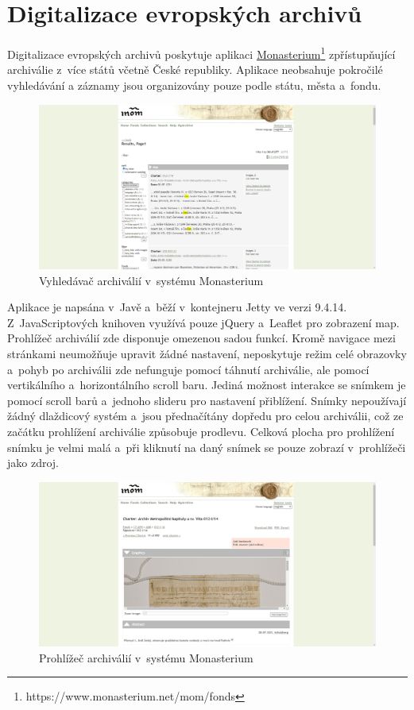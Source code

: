 \section{Digitalizace evropských archivů}
Digitalizace evropských archivů poskytuje aplikaci \href{https://www.monasterium.net/mom/fonds}{Monasterium}\footnote{https://www.monasterium.net/mom/fonds} zpřístupňující archiválie z~více států včetně České republiky. Aplikace neobsahuje pokročilé vyhledávání a záznamy jsou organizovány pouze podle státu, města a~fondu. 

\begin{figure}[htbp]
\centering
    \includegraphics[scale=.2]{obrazky-figures/archives/mom/vyhledani.png}
    \caption{Vyhledávač archiválií v~systému Monasterium}
\end{figure}

\newpage
\noindent
Aplikace je napsána v~Javě a~běží v~kontejneru Jetty ve verzi 9.4.14. Z~JavaScriptových knihoven využívá pouze jQuery a~Leaflet pro zobrazení map.
\newpara
Prohlížeč archiválií zde disponuje omezenou sadou funkcí. Kromě navigace mezi stránkami neumožňuje upravit žádné nastavení, neposkytuje režim celé obrazovky a~pohyb po archiválii zde nefunguje pomocí táhnutí archiválie, ale pomocí vertikálního a~horizontálního scroll baru. Jediná možnost interakce se snímkem je pomocí scroll barů a~jednoho slideru pro nastavení přiblížení. Snímky nepoužívají žádný dlaždicový systém a~jsou přednačítány dopředu pro celou archiválii, což ze začátku prohlížení archiválie způsobuje prodlevu. Celková plocha pro prohlížení snímku je velmi malá a~při kliknutí na daný snímek se pouze zobrazí v~prohlížeči jako zdroj.

\begin{figure}[htbp]
\centering
    \includegraphics[scale=.2]{obrazky-figures/archives/mom/prohlizec.png}
    \caption{Prohlížeč archiválií v~systému Monasterium}
\end{figure}

